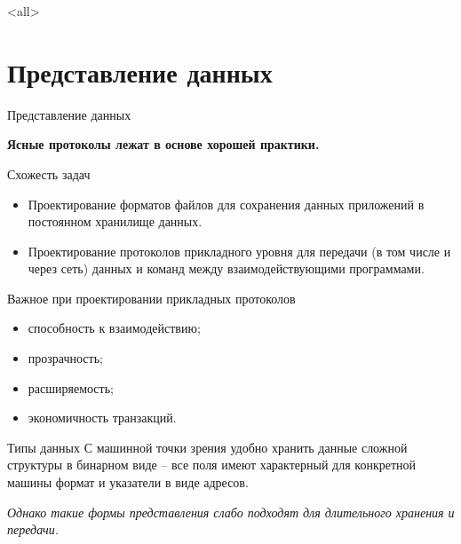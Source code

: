 

\subtitle{Форматы данных \\и проектирование пользовательских протоколов}



\mode<all>{}

%
%

\section{Представление данных}

\begin{frame}{Представление данных}
	\begin{center}
	{\Large\bfseries Ясные протоколы лежат в основе хорошей практики.}
	\end{center}
\end{frame}

\begin{frame}{Схожесть задач}
	\begin{itemize}
		\item Проектирование форматов файлов для сохранения данных приложений в постоянном хранилище данных.
		\item Проектирование протоколов прикладного уровня для передачи (в том числе и через сеть) данных и команд между взаимодействующими программами.
	\end{itemize}
\end{frame}

\begin{frame}{Важное при проектировании прикладных протоколов}
	\begin{itemize}
		\item способность к взаимодействию; 
			\pause
		\item прозрачность;
			\pause
		\item расширяемость;
			\pause
		\item экономичность транзакций.
	\end{itemize}
\end{frame}

\begin{frame}{Типы данных}
	С машинной точки зрения удобно хранить данные сложной структуры в бинарном виде -- все поля имеют характерный для конкретной машины формат и указатели в виде адресов.

	\pause
	{\itshape Однако такие формы представления слабо подходят для длительного хранения и передачи.}
\end{frame}

